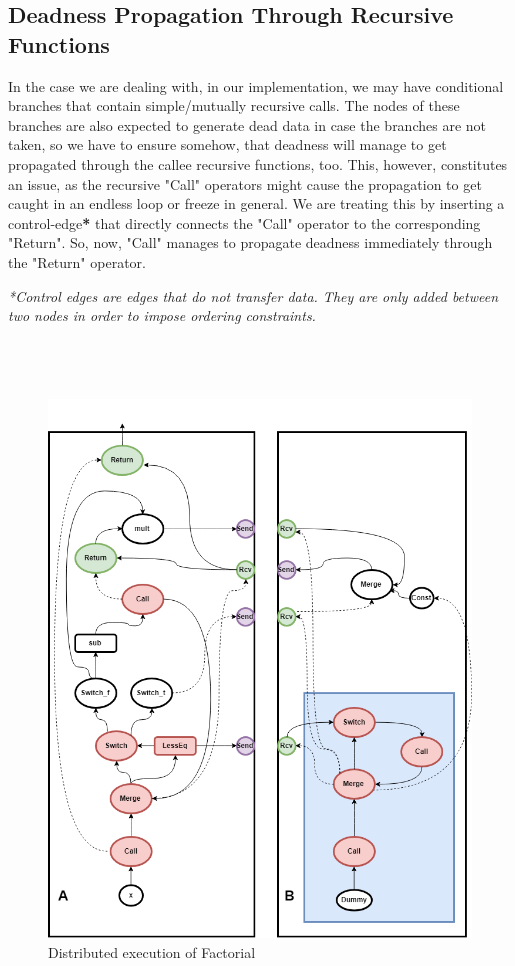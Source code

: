 \documentclass[ack,preface]{dithesis}
\begin{document}
    \subsection{Deadness Propagation Through Recursive Functions}

In the case we are dealing with, in our implementation, we may have conditional branches that contain simple/mutually recursive calls. The nodes of these branches are  also expected to generate dead data in case the branches are not taken, so we have to ensure somehow, that deadness will manage to get propagated through the callee recursive functions, too. This, however, constitutes an issue, as the recursive "Call" operators might cause the propagation to get caught in an endless loop or freeze in general. We are treating this by inserting a control-edge\textbf{*} that directly connects  the "Call" operator to the corresponding "Return". So, now, "Call" manages to propagate deadness immediately through the "Return" operator. 

\textit{*Control edges are edges that do not transfer data. They are only added between two nodes in order to impose ordering constraints.\\\\\\\\}

\begin{figure}
\centering
\includegraphics[scale=0.6]{figures/DistrFac}
\caption{Distributed execution of Factorial}
\end{figure}
\end{document}
